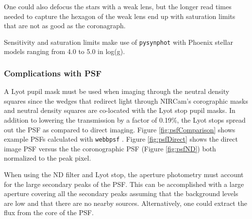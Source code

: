 \documentclass{aastex6}
\begin{document}
One could also defocus the stars with a weak lens, but the longer read times needed to capture the hexagon of the weak lens end up with saturation limits that are not as good as the coronagraph.

Sensitivity and saturation limits make use of \texttt{pysynphot} \citep{lim2015pysynphot} with Phoenix stellar models \citep{allard2012phoenix} ranging from 4.0 to 5.0 in log(g).

\subsubsection{Complications with PSF}
A Lyot pupil mask must be used when imaging through the neutral density squares since the wedges that redirect light through NIRCam's corographic masks and neutral density squares are co-located with the Lyot stop pupil masks.
In addition to lowering the transmission by a factor of 0.19\%, the Lyot stops spread out the PSF as compared to direct imaging.
Figure \ref{fig:psfComparison} shows example PSFs calculated with \texttt{webbpsf} \citep{perrin2012webbpsf}.
Figure \ref{fig:psfDirect} shows the direct image PSF versus the the coronographic PSF (Figure \ref{fig:psfND}) both normalized to the peak pixel.

When using the ND filter and Lyot stop, the aperture photometry must account for the large secondary peaks of the PSF.
This can be accomplished with a large aperture covering all the secondary peaks assuming that the background levels are low and that there are no nearby sources.
Alternatively, one could extract the flux from the core of the PSF.
\end{document}
